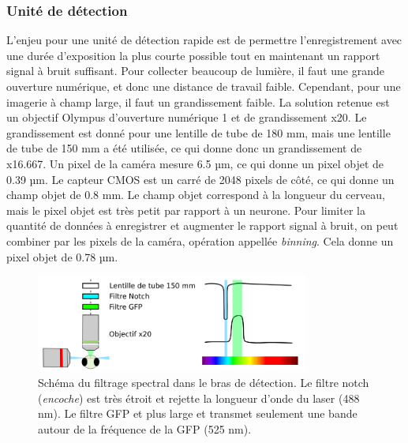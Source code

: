 \subsubsection{Unité de détection}

L'enjeu pour une unité de détection rapide est de permettre l'enregistrement avec une durée d'exposition la plus courte possible tout en maintenant un rapport signal à bruit suffisant. Pour collecter beaucoup de lumière, il faut une grande ouverture numérique, et donc une distance de travail faible. Cependant, pour une imagerie à champ large, il faut un grandissement faible. La solution retenue est un objectif Olympus d'ouverture numérique 1 et de grandissement x20. Le grandissement est donné pour une lentille de tube de 180 mm, mais une lentille de tube de 150 mm a été utilisée, ce qui donne donc un grandissement de x16.667. Un pixel de la caméra mesure 6.5 µm, ce qui donne un pixel objet de 0.39 µm. Le capteur CMOS est un carré de 2048 pixels de côté, ce qui donne un champ objet de 0.8 mm. Le champ objet correspond à la longueur du cerveau, mais le pixel objet est très petit par rapport à un neurone. Pour limiter la quantité de données à enregistrer et augmenter le rapport signal à bruit, on peut combiner par les pixels de la caméra, opération appellée \emph{binning}. Cela donne un pixel objet de 0.78 µm.

\begin{figure}
\centering
\includegraphics[width=0.8\textwidth]{./files/detection_unit.svg.png}
\caption{Schéma du filtrage spectral dans le bras de détection. Le filtre notch (\emph{encoche}) est très étroit et rejette la longueur d'onde du laser (488 nm). Le filtre GFP et plus large et transmet seulement une bande autour de la fréquence de la GFP (525 nm).}
\end{figure}



